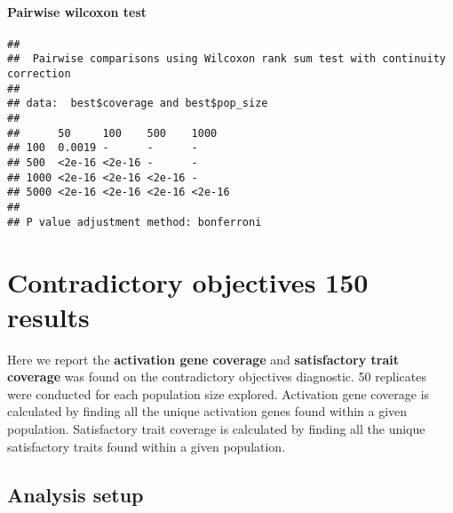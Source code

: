 \documentclass[
]{book}
\newenvironment{Shaded}{\begin{snugshade}}{\end{snugshade}}
\newcommand{\AttributeTok}[1]{\textcolor[rgb]{0.13,0.29,0.53}{#1}}
\newcommand{\ConstantTok}[1]{\textcolor[rgb]{0.56,0.35,0.01}{#1}}
\newcommand{\FunctionTok}[1]{\textcolor[rgb]{0.13,0.29,0.53}{\textbf{#1}}}
\newcommand{\NormalTok}[1]{#1}
\newcommand{\SpecialCharTok}[1]{\textcolor[rgb]{0.81,0.36,0.00}{\textbf{#1}}}
\newcommand{\StringTok}[1]{\textcolor[rgb]{0.31,0.60,0.02}{#1}}
\begin{document}
\hypertarget{pairwise-wilcoxon-test-2}{%
\subsubsection{Pairwise wilcoxon test}\label{pairwise-wilcoxon-test-2}}

\begin{Shaded}
\end{Shaded}

\begin{verbatim}
## 
##  Pairwise comparisons using Wilcoxon rank sum test with continuity correction 
## 
## data:  best$coverage and best$pop_size 
## 
##      50     100    500    1000  
## 100  0.0019 -      -      -     
## 500  <2e-16 <2e-16 -      -     
## 1000 <2e-16 <2e-16 <2e-16 -     
## 5000 <2e-16 <2e-16 <2e-16 <2e-16
## 
## P value adjustment method: bonferroni
\end{verbatim}

\hypertarget{contradictory-objectives-150-results}{%
\chapter{Contradictory objectives 150 results}\label{contradictory-objectives-150-results}}

Here we report the \textbf{activation gene coverage} and \textbf{satisfactory trait coverage} was found on the contradictory objectives diagnostic.
50 replicates were conducted for each population size explored.
Activation gene coverage is calculated by finding all the unique activation genes found within a given population.
Satisfactory trait coverage is calculated by finding all the unique satisfactory traits found within a given population.

\hypertarget{analysis-setup-2}{%
\section{Analysis setup}\label{analysis-setup-2}}
\end{document}
